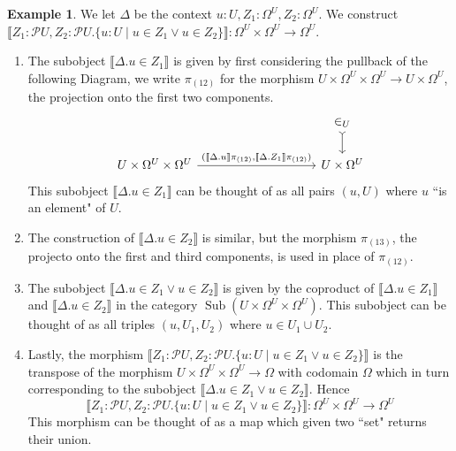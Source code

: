 \documentclass{birkjour}
\theoremstyle{plain}
\theoremstyle{definition}
\newtheorem{example}[thm]{Example}
\newcommand{\call}[1]{\mathcal{#1}}
\newcommand{\lto}{\longrightarrow}
\begin{document}
	\begin{example}\label{ex:union}
		We let $\Delta$ be the context $u:U, Z_1:\Omega^U, Z_2: \Omega^U$. We construct $\llbracket Z_1:\call{P}U, Z_2:\call{P}U. \lbrace u : U \mid u \in Z_1 \vee u \in Z_2 \rbrace \rrbracket : \Omega^U \times \Omega^U \lto \Omega^U$.
		\begin{enumerate}
			\item The subobject $\llbracket \Delta . u \in Z_1 \rrbracket$ is given by first considering the pullback of the following Diagram, we write $\pi_{(12)}$ for the morphism $U \times \Omega^U \times \Omega^U \lto U \times \Omega^U$, the projection onto the first two components.
			\begin{equation}
				\begin{tikzcd}[column sep = huge]
					& & \in_U\arrow[d, rightarrowtail]\\
					U \times \Omega^U \times \Omega^U\arrow[rr,"{(\llbracket \Delta. u\rrbracket\pi_{(12)}, \llbracket \Delta. Z_1 \rrbracket\pi_{(12)})}"] & & U \times \Omega^U
				\end{tikzcd}
			\end{equation}
			This subobject $\llbracket \Delta. u \in Z_1\rrbracket$ can be thought of as all pairs $(u, U)$ where $u$ ``is an element" of $U$.
			\item The construction of $\llbracket \Delta. u \in Z_2\rrbracket$ is similar, but the morphism $\pi_{(13)}$, the projecto onto the first and third components, is used in place of $\pi_{(12)}$.
			\item The subobject $\llbracket \Delta. u \in Z_1 \vee u \in Z_2\rrbracket$ is given by the coproduct of $\llbracket \Delta. u \in Z_1 \rrbracket$ and $\llbracket \Delta. u \in Z_2 \rrbracket$ in the category $\operatorname{Sub}(U \times \Omega^U \times \Omega^U)$. This subobject can be thought of as all triples $(u,U_1,U_2)$ where $u \in U_1 \cup U_2$.
			\item Lastly, the morphism $\llbracket Z_1:\call{P}U, Z_2:\call{P}U. \lbrace u:U \mid u \in Z_1 \vee u \in Z_2 \rbrace \rrbracket$ is the transpose of the morphism $U \times \Omega^U \times \Omega^U \lto \Omega$ with codomain $\Omega$ which in turn corresponding to the subobject $\llbracket \Delta. u \in Z_1 \vee u \in Z_2 \rrbracket$. Hence
			\begin{equation}
				\llbracket Z_1:\call{P}U, Z_2:\call{P}U. \lbrace u : U \mid u \in Z_1 \vee u \in Z_2 \rbrace \rrbracket : \Omega^U \times \Omega^U \lto \Omega^U
			\end{equation}
			This morphism can be thought of as a map which given two ``set" returns their union.
		\end{enumerate}
	\end{example}
\end{document}
